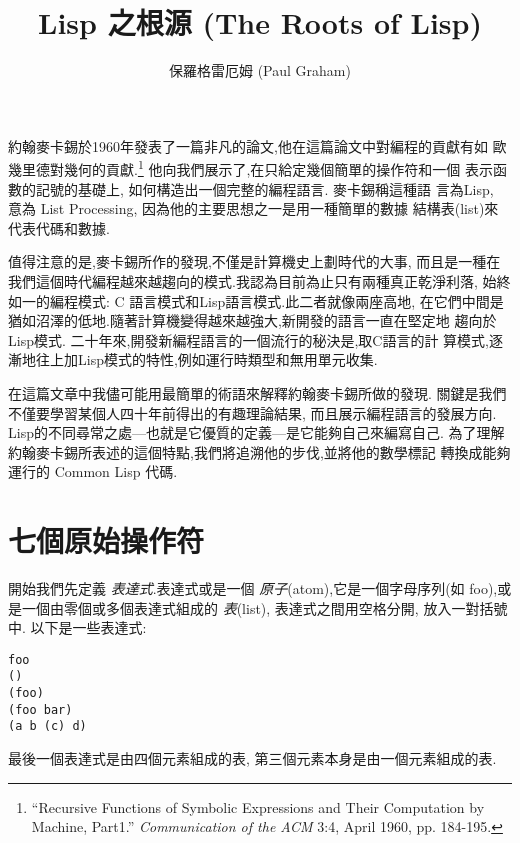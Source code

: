 \documentclass[12pt]{article}
\begin{document}
 
\begin{CJK}{UTF8}{bsmi} %
\title{Lisp 之根源 (The Roots of Lisp)} 
\author{保羅格雷厄姆 (Paul Graham)} 
\maketitle 
\newcommand{\pone}{$p_{1}$} 
\newcommand{\pn}{$p_{n}$} 
\newcommand{\aone}{$a_{1}$} 
\newcommand{\an}{$a_{n}$} 
\newcommand{\vone}{$v_{1}$} 
\newcommand{\vn}{$v_{n}$} 
\newcommand{\eone}{$e_{1}$} 
\newcommand{\en}{$e_{n}$} 
約翰麥卡錫於1960年發表了一篇非凡的論文,他在這篇論文中對編程的貢獻有如 
歐幾里德對幾何的貢獻.\footnote{``Recursive Functions of Symbolic Expressions and Their Computation by Machine, Part1.'' 
{\it Communication of the ACM} 3:4, April 1960, pp.  184-195.} 
他向我們展示了,在只給定幾個簡單的操作符和一個 
表示函數的記號的基礎上, 
如何構造出一個完整的編程語言. 
麥卡錫稱這種語 
言為Lisp, 
意為 
List 
Processing, 
因為他的主要思想之一是用一種簡單的數據 
結構表(list)來代表代碼和數據. 

值得注意的是,麥卡錫所作的發現,不僅是計算機史上劃時代的大事, 
而且是一種在我們這個時代編程越來越趨向的模式.我認為目前為止只有兩種真正乾淨利落, 
始終如一的編程模式: C 語言模式和Lisp語言模式.此二者就像兩座高地, 
在它們中間是猶如沼澤的低地.隨著計算機變得越來越強大,新開發的語言一直在堅定地 
趨向於Lisp模式. 
二十年來,開發新編程語言的一個流行的秘決是,取C語言的計 
算模式,逐漸地往上加Lisp模式的特性,例如運行時類型和無用單元收集. 

在這篇文章中我儘可能用最簡單的術語來解釋約翰麥卡錫所做的發現. 
關鍵是我們不僅要學習某個人四十年前得出的有趣理論結果, 
而且展示編程語言的發展方向. 
Lisp的不同尋常之處---也就是它優質的定義---是它能夠自己來編寫自己. 
為了理解約翰麥卡錫所表述的這個特點,我們將追溯他的步伐,並將他的數學標記 
轉換成能夠運行的 Common Lisp 代碼. 

\section{七個原始操作符} 
開始我們先定義{\em 
表達式}.表達式或是一個{\em 
原子}(atom),它是一個字母序列(如 
foo),或是一個由零個或多個表達式組成的{\em 
表}(list), 
表達式之間用空格分開, 
放入一對括號中. 
以下是一些表達式: 
\begin{verbatim} 
foo 
() 
(foo) 
(foo bar) 
(a b (c) d) 
\end{verbatim} 
最後一個表達式是由四個元素組成的表, 
第三個元素本身是由一個元素組成的表. 


\end{CJK}
\end{document}
